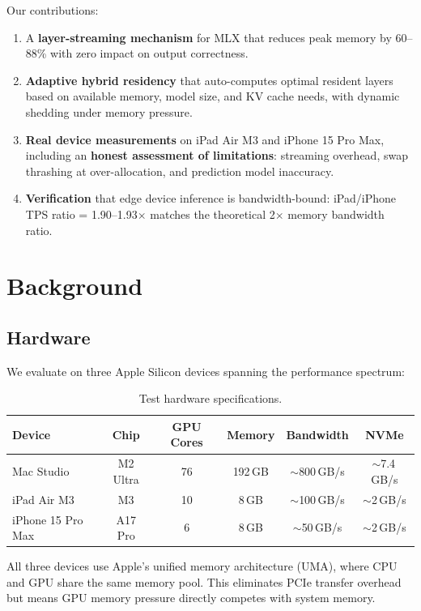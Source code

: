 \documentclass[10pt,a4paper]{article}
\begin{document}
Our contributions:
\begin{enumerate}
    \item A \textbf{layer-streaming mechanism} for MLX that reduces peak memory by 60--88\% with zero impact on output correctness.
    \item \textbf{Adaptive hybrid residency} that auto-computes optimal resident layers based on available memory, model size, and KV cache needs, with dynamic shedding under memory pressure.
    \item \textbf{Real device measurements} on iPad Air M3 and iPhone 15 Pro Max, including an \textbf{honest assessment of limitations}: streaming overhead, swap thrashing at over-allocation, and prediction model inaccuracy.
    \item \textbf{Verification} that edge device inference is bandwidth-bound: iPad/iPhone TPS ratio = 1.90--1.93$\times$ matches the theoretical 2$\times$ memory bandwidth ratio.
\end{enumerate}

\section{Background}

\subsection{Hardware}

We evaluate on three Apple Silicon devices spanning the performance spectrum:

\begin{table}[ht!]
\centering\small
\caption{Test hardware specifications.}
\label{tab:hardware}
\begin{tabular}{lccccc}
\toprule
\textbf{Device} & \textbf{Chip} & \textbf{GPU Cores} & \textbf{Memory} & \textbf{Bandwidth} & \textbf{NVMe} \\
\midrule
Mac Studio    & M2 Ultra & 76 & 192\,GB & $\sim$800\,GB/s & $\sim$7.4\,GB/s \\
iPad Air M3   & M3       & 10 & 8\,GB   & $\sim$100\,GB/s & $\sim$2\,GB/s \\
iPhone 15 Pro Max & A17 Pro & 6 & 8\,GB  & $\sim$50\,GB/s  & $\sim$2\,GB/s \\
\bottomrule
\end{tabular}
\end{table}

All three devices use Apple's unified memory architecture (UMA), where CPU and GPU share the same memory pool. This eliminates PCIe transfer overhead but means GPU memory pressure directly competes with system memory.
\end{document}
